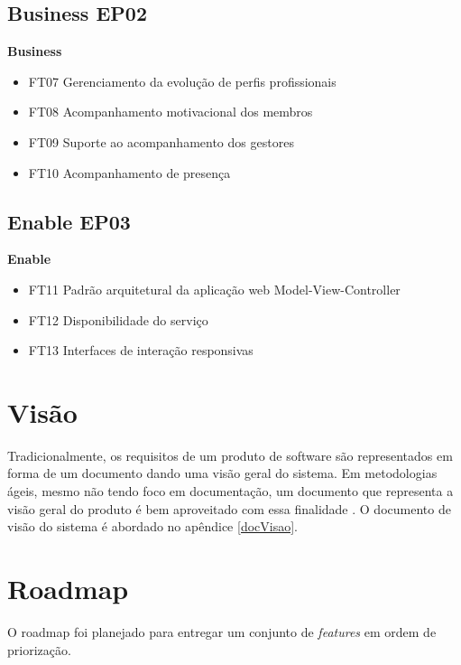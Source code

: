 \subsection{Business EP02}
\textbf{Business}
\begin{itemize}
    \item FT07 Gerenciamento da evolução de perfis profissionais
    \item FT08 Acompanhamento motivacional dos membros
    \item FT09 Suporte ao acompanhamento dos gestores
    \item FT10 Acompanhamento de presença
\end{itemize}
\subsection{Enable EP03}
\textbf{Enable}
\begin{itemize}
    \item FT11 Padrão arquitetural da aplicação web Model-View-Controller
    \item FT12 Disponibilidade do serviço
    \item FT13 Interfaces de interação responsivas
\end{itemize}
\section{Visão}

Tradicionalmente, os requisitos de um produto de software são representados em forma de um documento dando uma visão geral do sistema. Em metodologias ágeis, mesmo não tendo foco em documentação, um documento que representa a visão geral do produto é bem aproveitado com essa finalidade \cite{leffingwell2011}. O documento de visão do sistema é abordado no apêndice \ref{docVisao}.

\section{Roadmap}

O roadmap foi planejado para entregar um conjunto de \textit{features} em ordem de priorização.

